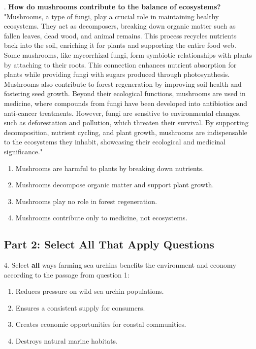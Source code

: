 \documentclass[12pt]{article}
\begin{document}
. \textbf{How do mushrooms contribute to the balance of ecosystems?\\}
"Mushrooms, a type of fungi, play a crucial role in maintaining healthy ecosystems. They act as decomposers, breaking down organic matter such as fallen leaves, dead wood, and animal remains. This process recycles nutrients back into the soil, enriching it for plants and supporting the entire food web. Some mushrooms, like mycorrhizal fungi, form symbiotic relationships with plants by attaching to their roots. This connection enhances nutrient absorption for plants while providing fungi with sugars produced through photosynthesis. Mushrooms also contribute to forest regeneration by improving soil health and fostering seed growth. Beyond their ecological functions, mushrooms are used in medicine, where compounds from fungi have been developed into antibiotics and anti-cancer treatments. However, fungi are sensitive to environmental changes, such as deforestation and pollution, which threaten their survival. By supporting decomposition, nutrient cycling, and plant growth, mushrooms are indispensable to the ecosystems they inhabit, showcasing their ecological and medicinal significance."  
\begin{enumerate}[label=\Alph*.]
    \item Mushrooms are harmful to plants by breaking down nutrients.  
    \item Mushrooms decompose organic matter and support plant growth. 
    \item Mushrooms play no role in forest regeneration.  
    \item Mushrooms contribute only to medicine, not ecosystems.  
\end{enumerate}



\subsection*{Part 2: Select All That Apply Questions}

4. Select \textbf{all} ways farming sea urchins benefits the environment and economy according to the passage from question 1:  
\begin{enumerate}[label=\Alph*.]
    \item Reduces pressure on wild sea urchin populations.  
    \item Ensures a consistent supply for consumers.  
    \item Creates economic opportunities for coastal communities.  
    \item Destroys natural marine habitats.  
\end{enumerate}
\end{document}
